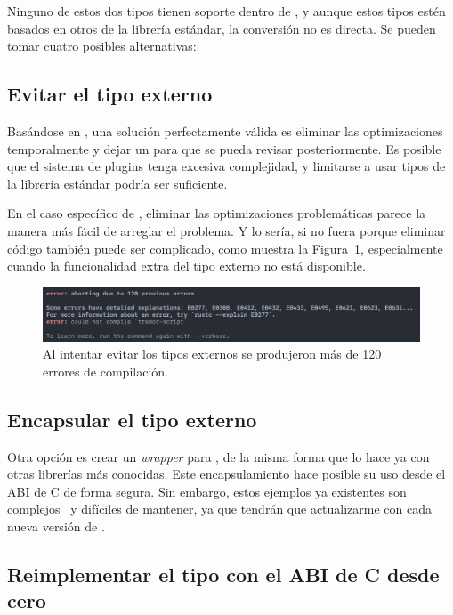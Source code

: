 Ninguno de estos dos tipos tienen soporte dentro de \abistable, y aunque estos
tipos estén basados en otros de la librería estándar, la conversión no es
directa. Se pueden tomar cuatro posibles alternativas:

\subsection{Evitar el tipo externo}

Basándose en \work, una solución perfectamente válida es eliminar las
optimizaciones temporalmente y dejar un  para que se pueda revisar
posteriormente. Es posible que el sistema de plugins tenga excesiva complejidad,
y limitarse a usar tipos de la librería estándar podría ser suficiente.

En el caso específico de , eliminar las optimizaciones problemáticas
parece la manera más fácil de arreglar el problema. Y lo sería, si no fuera
porque eliminar código también puede ser complicado, como muestra la
Figura~\ref{fig:errors}, especialmente cuando la funcionalidad extra del tipo
externo no está disponible.

\begin{figure}
    \centering
    \includegraphics[width=\textwidth]{./Imagenes/errors.png}
    \caption{Al intentar evitar los tipos externos se produjeron más de 120
    errores de compilación.}%
    \label{fig:errors}
\end{figure}

\subsection{Encapsular el tipo externo}

Otra opción es crear un \emph{wrapper} para , de la misma forma
que lo hace ya \abistable con otras librerías más conocidas. Este
encapsulamiento hace posible su uso desde el ABI de C de forma segura. Sin
embargo, estos ejemplos ya existentes son complejos~\cite{complexwrapper} y
difíciles de mantener, ya que tendrán que actualizarme con cada nueva versión de
.

\subsection{Reimplementar el tipo con el ABI de C desde cero}

